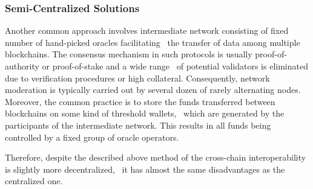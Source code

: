 \subsubsection{Semi-Centralized Solutions}\label{subsubsec:semi-centralized-solutions}

Another common approach involves intermediate network consisting of fixed number of hand-picked oracles facilitating \
the transfer of data among multiple blockchains.
The consensus mechanism in such protocols is usually proof-of-authority or proof-of-stake and a wide range \
of potential validators is eliminated due to verification procedures or high collateral.
Consequently, network moderation is typically carried out by several dozen of rarely alternating nodes.
Moreover, the common practice is to store the funds transferred between blockchains on some kind of threshold wallets, \
which are generated by the participants of the intermediate network.
This results in all funds being controlled by a fixed group of oracle operators.

Therefore, despite the described above method of the cross-chain interoperability is slightly more decentralized, \
it has almost the same disadvantages as the centralized one.